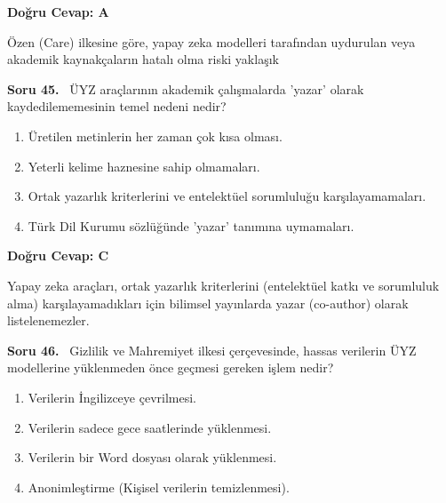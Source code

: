 \documentclass[11pt,a4paper,openany]{book}
\begin{document}
\vspace{4pt}
\begin{tcolorbox}[title=Cevap ve Açıklama, colback=gray!3!white, colframe=primarycolor!90!black, arc=2mm, fonttitle=\bfseries\sffamily, top=6pt, bottom=6pt]
    \textbf{Doğru Cevap: A}

    \vspace{2pt}
    Özen (Care) ilkesine göre, yapay zeka modelleri tarafından uydurulan veya akademik kaynakçaların hatalı olma riski yaklaşık %
\end{tcolorbox}
\vspace{10pt}
\needspace{5cm}
\vspace{8pt}
\noindent\textbf{\large\sffamily Soru 45.} \ ÜYZ araçlarının akademik çalışmalarda 'yazar' olarak kaydedilememesinin temel nedeni nedir?

\begin{enumerate}[label=\Alph*), leftmargin=25pt, topsep=4pt, itemsep=2pt]
        \item Üretilen metinlerin her zaman çok kısa olması.
        \item Yeterli kelime haznesine sahip olmamaları.
        \item Ortak yazarlık kriterlerini ve entelektüel sorumluluğu karşılayamamaları.
        \item Türk Dil Kurumu sözlüğünde 'yazar' tanımına uymamaları.
\end{enumerate}

\vspace{4pt}
\begin{tcolorbox}[title=Cevap ve Açıklama, colback=gray!3!white, colframe=primarycolor!90!black, arc=2mm, fonttitle=\bfseries\sffamily, top=6pt, bottom=6pt]
    \textbf{Doğru Cevap: C}

    \vspace{2pt}
    Yapay zeka araçları, ortak yazarlık kriterlerini (entelektüel katkı ve sorumluluk alma) karşılayamadıkları için bilimsel yayınlarda yazar (co-author) olarak listelenemezler.
\end{tcolorbox}
\vspace{10pt}
\needspace{5cm}
\vspace{8pt}
\noindent\textbf{\large\sffamily Soru 46.} \ Gizlilik ve Mahremiyet ilkesi çerçevesinde, hassas verilerin ÜYZ modellerine yüklenmeden önce geçmesi gereken işlem nedir?

\begin{enumerate}[label=\Alph*), leftmargin=25pt, topsep=4pt, itemsep=2pt]
        \item Verilerin İngilizceye çevrilmesi.
        \item Verilerin sadece gece saatlerinde yüklenmesi.
        \item Verilerin bir Word dosyası olarak yüklenmesi.
        \item Anonimleştirme (Kişisel verilerin temizlenmesi).
\end{enumerate}
\end{document}
